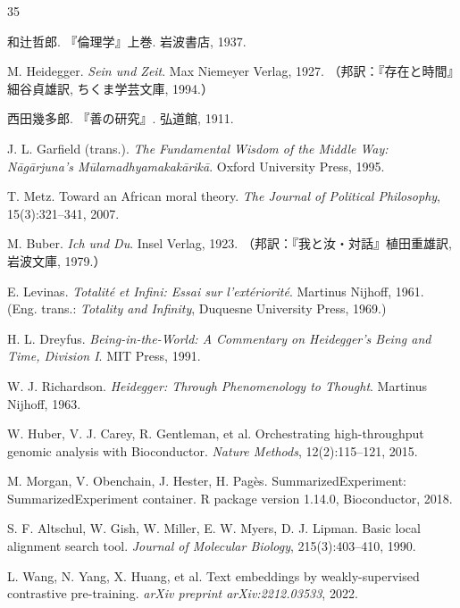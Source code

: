 \documentclass[a4paper,11pt]{ltjsarticle}
\begin{document}
\begin{thebibliography}{35}

 和辻哲郎. 『倫理学』上巻. 岩波書店, 1937.

 M. Heidegger. \textit{Sein und Zeit}. Max Niemeyer Verlag, 1927. （邦訳：『存在と時間』細谷貞雄訳, ちくま学芸文庫, 1994.）

 西田幾多郎. 『善の研究』. 弘道館, 1911.

 J. L. Garfield (trans.). \textit{The Fundamental Wisdom of the Middle Way: Nāgārjuna's Mūlamadhyamakakārikā}. Oxford University Press, 1995.

 T. Metz. Toward an African moral theory. \textit{The Journal of Political Philosophy}, 15(3):321--341, 2007.

 M. Buber. \textit{Ich und Du}. Insel Verlag, 1923. （邦訳：『我と汝・対話』植田重雄訳, 岩波文庫, 1979.）

 E. Levinas. \textit{Totalité et Infini: Essai sur l'extériorité}. Martinus Nijhoff, 1961. (Eng. trans.: \textit{Totality and Infinity}, Duquesne University Press, 1969.)

 H. L. Dreyfus. \textit{Being-in-the-World: A Commentary on Heidegger's Being and Time, Division I}. MIT Press, 1991.

 W. J. Richardson. \textit{Heidegger: Through Phenomenology to Thought}. Martinus Nijhoff, 1963.

 W. Huber, V. J. Carey, R. Gentleman, et al. Orchestrating high-throughput genomic analysis with Bioconductor. \textit{Nature Methods}, 12(2):115--121, 2015.

 M. Morgan, V. Obenchain, J. Hester, H. Pagès. SummarizedExperiment: SummarizedExperiment container. R package version 1.14.0, Bioconductor, 2018.

 S. F. Altschul, W. Gish, W. Miller, E. W. Myers, D. J. Lipman. Basic local alignment search tool. \textit{Journal of Molecular Biology}, 215(3):403--410, 1990.

 L. Wang, N. Yang, X. Huang, et al. Text embeddings by weakly-supervised contrastive pre-training. \textit{arXiv preprint arXiv:2212.03533}, 2022.


\end{thebibliography}
\end{document}
